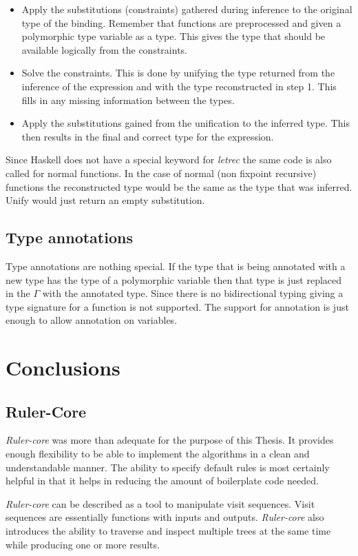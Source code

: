 \documentclass[twoside, titlepage, openright, a4paper]{book}
\newcommand{\Rcore}{\emph{Ruler-core }}
\begin{document}
\begin{itemize}
\item Apply the substitutions (constraints) gathered during inference to the original type of the binding. Remember that functions are preprocessed and given a polymorphic type variable as a type. This gives the type that should be available logically from the constraints.
\item Solve the constraints. This is done by unifying the type returned from the inference of the expression and with the type reconstructed in step 1. This fills in any missing information between the types.
\item Apply the substitutions gained from the unification to the inferred type. This then results in the final and correct type for the expression.
\end{itemize}

Since Haskell does not have a special keyword for \emph{letrec} the same code is also called for normal functions. In the case of normal (non fixpoint recursive) functions the reconstructed type would be the same as the type that was inferred. Unify would just return an empty substitution.

\section{Type annotations}
Type annotations are nothing special. If the type that is being annotated with a new type has the type of a polymorphic variable then that type is just replaced in the $\Gamma$ with the annotated type. Since there is no bidirectional typing giving a type signature for a function is not supported. The support for annotation is just enough to allow annotation on variables.

\chapter{Conclusions}
\section{Ruler-Core}
\Rcore was more than adequate for the purpose of this Thesis. It provides enough flexibility to be able to implement the algorithms in a clean and understandable manner. The ability to specify default rules is most certainly helpful in that it helps in reducing the amount of boilerplate code needed.

\Rcore can be described as a tool to manipulate visit sequences. Visit sequences are essentially functions with inputs and outputs. \Rcore also introduces the ability to traverse and inspect multiple trees at the same time while producing one or more results. 
\end{document}
